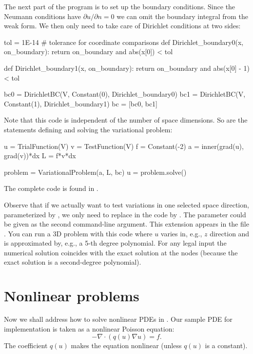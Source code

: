 The next part of the program is to set up the boundary conditions.
Since the Neumann conditions have $\partial u/\partial n=0$ we can
omit the boundary integral from the weak form. We then only
need to take care of Dirichlet conditions at two sides:
\begin{python}
tol = 1E-14   # tolerance for coordinate comparisons
def Dirichlet_boundary0(x, on_boundary):
    return on_boundary and abs(x[0]) < tol

def Dirichlet_boundary1(x, on_boundary):
    return on_boundary and abs(x[0] - 1) < tol

bc0 = DirichletBC(V, Constant(0), Dirichlet_boundary0)
bc1 = DirichletBC(V, Constant(1), Dirichlet_boundary1)
bc = [bc0, bc1]
\end{python}
Note that this code is independent of the number of space dimensions.
So are the statements defining and solving
the variational problem:
\begin{python}
u = TrialFunction(V)
v = TestFunction(V)
f = Constant(-2)
a = inner(grad(u), grad(v))*dx
L = f*v*dx

problem = VariationalProblem(a, L, bc)
u = problem.solve()
\end{python}
The complete code is found in .

Observe that if we actually want to test variations in one selected
space direction, parameterized by ,
we only need to replace  in the
code by . The parameter
 could be given as the second
command-line argument.  This extension appears in the file
.  You can run a 3D
problem with this code where $u$ varies in, e.g., $z$ direction and is
approximated by, e.g., a 5-th degree polynomial.  For any legal input
the numerical solution coincides with the exact solution at the nodes
(because the exact solution is a second-degree polynomial).

\section{Nonlinear problems}
\label{langtangen:poisson:nonlinear}
\label{nonlinear PDEs}

Now we shall address how to solve nonlinear PDEs in \fenics. Our
sample PDE for implementation is taken as a nonlinear Poisson
equation:
\begin{equation}
-\nabla\cdot\left( q(u)\nabla u\right) = f.
\end{equation}
The coefficient $q(u)$ makes the equation nonlinear (unless $q(u)$
is a constant).

